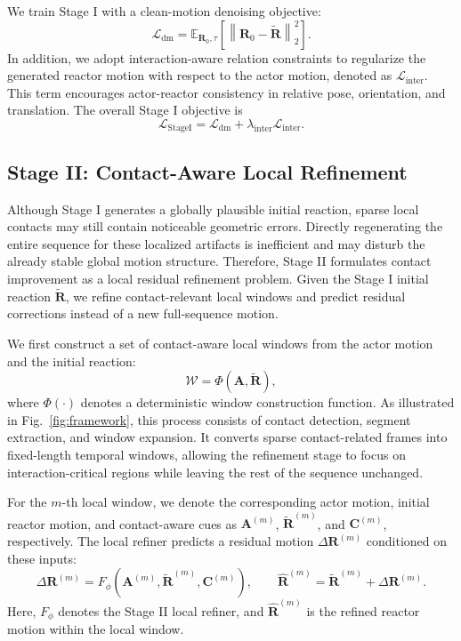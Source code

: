 \documentclass{article}
\begin{document}
We train Stage I with a clean-motion denoising objective:
\begin{equation}
\mathcal{L}_{\mathrm{dm}}
=
\mathbb{E}_{\mathbf{R}_{0},\tau}
\left[
\left\|
\mathbf{R}_{0}
-
\widetilde{\mathbf{R}}
\right\|_{2}^{2}
\right].
\end{equation}
In addition, we adopt interaction-aware relation constraints to regularize the generated reactor motion with respect to the actor motion, denoted as $\mathcal{L}_{\mathrm{inter}}$. This term encourages actor-reactor consistency in relative pose, orientation, and translation. The overall Stage I objective is
\begin{equation}
\mathcal{L}_{\mathrm{StageI}}
=
\mathcal{L}_{\mathrm{dm}}
+
\lambda_{\mathrm{inter}}
\mathcal{L}_{\mathrm{inter}}.
\end{equation}



\subsection{Stage II: Contact-Aware Local Refinement}

Although Stage I generates a globally plausible initial reaction, sparse local contacts may still contain noticeable geometric errors. Directly regenerating the entire sequence for these localized artifacts is inefficient and may disturb the already stable global motion structure. Therefore, Stage II formulates contact improvement as a local residual refinement problem. Given the Stage I initial reaction $\widetilde{\mathbf{R}}$, we refine contact-relevant local windows and predict residual corrections instead of a new full-sequence motion.

We first construct a set of contact-aware local windows from the actor motion and the initial reaction:
\begin{equation}
\mathcal{W}
=
\Phi
\left(
\mathbf{A},
\widetilde{\mathbf{R}}
\right),
\end{equation}
where $\Phi(\cdot)$ denotes a deterministic window construction function. As illustrated in Fig.~\ref{fig:framework}, this process consists of contact detection, segment extraction, and window expansion. It converts sparse contact-related frames into fixed-length temporal windows, allowing the refinement stage to focus on interaction-critical regions while leaving the rest of the sequence unchanged.

For the $m$-th local window, we denote the corresponding actor motion, initial reactor motion, and contact-aware cues as $\mathbf{A}^{(m)}$, $\widetilde{\mathbf{R}}^{(m)}$, and $\mathbf{C}^{(m)}$, respectively. The local refiner predicts a residual motion $\Delta\mathbf{R}^{(m)}$ conditioned on these inputs:
\begin{equation}
\Delta\mathbf{R}^{(m)}
=
F_{\phi}
\left(
\mathbf{A}^{(m)},
\widetilde{\mathbf{R}}^{(m)},
\mathbf{C}^{(m)}
\right),
\qquad
\widehat{\mathbf{R}}^{(m)}
=
\widetilde{\mathbf{R}}^{(m)}
+
\Delta\mathbf{R}^{(m)}.
\end{equation}
Here, $F_{\phi}$ denotes the Stage II local refiner, and $\widehat{\mathbf{R}}^{(m)}$ is the refined reactor motion within the local window.
\end{document}
